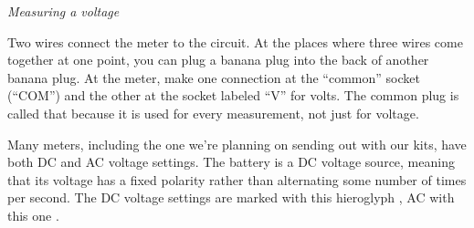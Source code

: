 \emph{Measuring a voltage}

Two wires connect the meter to the circuit. 
At the places where three wires come together at
one point, you can plug a banana plug into the back of
another banana plug. At the meter, make one connection
at the ``common'' socket (``COM'') and the other at the
socket labeled ``V'' for volts. The common plug is called
that because it is used for every measurement, not just for
voltage.

Many meters, including the one we're planning on sending out
with our kits, have both DC and AC voltage settings. The battery is
a DC voltage source, meaning that its voltage has a fixed polarity rather
than alternating some number of times per second. The DC voltage
settings are marked with this hieroglyph ,
AC with this one .

